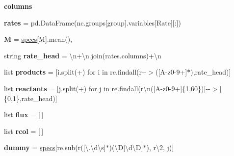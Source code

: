 \begin{DoxyCompactItemize}
{\bfseries columns}
\item 
\mbox{\label{namespaceropa__tool_ab433fdcb5774e431dc2673370dd97c6f}} 
{\bfseries rates} = pd.\+Data\+Frame(nc.\+groups\mbox{[}group\mbox{]}.variables\mbox{[}\textquotesingle{}Rate\textquotesingle{}\mbox{]}\mbox{[}\+:\mbox{]})
\item 
\mbox{\label{namespaceropa__tool_aba9c20771e3090731a8350af5bcf1b58}} 
{\bfseries M} = \mbox{\hyperlink{namespaceropa__tool_aa744f70435f5581e7e9d31783776f50c}{specs}}\mbox{[}\textquotesingle{}M\textquotesingle{}\mbox{]}.mean(),
\item 
\mbox{\label{namespaceropa__tool_aef9230309f67d19bcb6da205bd72e0e5}} 
string {\bfseries rate\+\_\+head} = \textquotesingle{}\textbackslash{}n\textquotesingle{}+\textquotesingle{}\textbackslash{}n\textquotesingle{}.join(rates.\+columns)+\textquotesingle{}\textbackslash{}n\textquotesingle{}
\item 
\mbox{\label{namespaceropa__tool_a181a2cb979199797275e3e7422bd7217}} 
list {\bfseries products} = \mbox{[}i.\+split(\textquotesingle{}+\textquotesingle{}) for i in re.\+findall(r\textquotesingle{}-\/-\/$>$(\mbox{[}A-\/z0-\/9+\mbox{]}$\ast$)\textquotesingle{},rate\+\_\+head)\mbox{]}
\item 
\mbox{\label{namespaceropa__tool_afa79b1220b02a0b5007da1b11e52a8ee}} 
list {\bfseries reactants} = \mbox{[}j.\+split(\textquotesingle{}+\textquotesingle{}) for j in re.\+findall(r\textquotesingle{}\textbackslash{}n(\mbox{[}A-\/z0-\/9+\mbox{]}\{1,60\})\mbox{[}-\/-\/$>$\mbox{]}\{0,1\}\textquotesingle{},rate\+\_\+head)\mbox{]}
\item 
\mbox{\label{namespaceropa__tool_a1ee968ae0da8e9ee33aef2e0243a5e50}} 
list {\bfseries flux} = \mbox{[}$\,$\mbox{]}
\item 
\mbox{\label{namespaceropa__tool_a9ca8877e2c6a990e867c309f1597af27}} 
list {\bfseries rcol} = \mbox{[}$\,$\mbox{]}
\item 
\mbox{\label{namespaceropa__tool_af7d48f97c7b0e9c66280beaee707ccac}} 
{\bfseries dummy} = \mbox{\hyperlink{namespaceropa__tool_aa744f70435f5581e7e9d31783776f50c}{specs}}\mbox{[}re.\+sub(r\textquotesingle{}(\mbox{[}\textbackslash{}.\textbackslash{}d\textbackslash{}s\mbox{]}$\ast$)(\textbackslash{}D\mbox{[}\textbackslash{}d\textbackslash{}D\mbox{]}$\ast$)\textquotesingle{}, r\textquotesingle{}\textbackslash{}2\textquotesingle{}, j)\mbox{]}

\end{DoxyCompactItemize}
